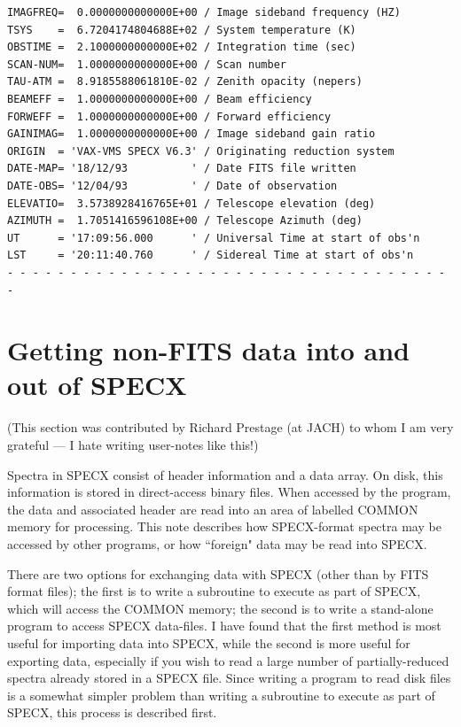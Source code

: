 \documentclass[11pt,twoside]{report}
\begin{document}
\begin{verbatim}
IMAGFREQ=  0.0000000000000E+00 / Image sideband frequency (HZ)
TSYS    =  6.7204174804688E+02 / System temperature (K)
OBSTIME =  2.1000000000000E+02 / Integration time (sec)
SCAN-NUM=  1.0000000000000E+00 / Scan number                                    
TAU-ATM =  8.9185588061810E-02 / Zenith opacity (nepers)
BEAMEFF =  1.0000000000000E+00 / Beam efficiency
FORWEFF =  1.0000000000000E+00 / Forward efficiency 
GAINIMAG=  1.0000000000000E+00 / Image sideband gain ratio
ORIGIN  = 'VAX-VMS SPECX V6.3' / Originating reduction system 
DATE-MAP= '18/12/93          ' / Date FITS file written
DATE-OBS= '12/04/93          ' / Date of observation
ELEVATIO=  3.5738928416765E+01 / Telescope elevation (deg)
AZIMUTH =  1.7051416596108E+00 / Telescope Azimuth (deg)
UT      = '17:09:56.000      ' / Universal Time at start of obs'n
LST     = '20:11:40.760      ' / Sidereal Time at start of obs'n
- - - - - - - - - - - - - - - - - - - - - - - - - - - - - - - - - - - - 
\end{verbatim}

\newpage
\chapter{Getting non-FITS data into and out of SPECX}

(This section was contributed by Richard Prestage (at JACH) to whom I am
very grateful --- I hate writing user-notes like this!)

Spectra in SPECX consist of header information and a data array. On
disk, this information is stored in direct-access binary files. When
accessed by the program, the data and associated header are read into
an area of labelled COMMON memory for processing. This note describes
how SPECX-format spectra may be accessed by other programs, or how
``foreign" data may be read into SPECX. 

There are two options for exchanging data with SPECX (other than by FITS
format files); the first is to
write a subroutine to execute as part of SPECX, which will access the
COMMON memory; the second is to write a stand-alone program to access
SPECX data-files. I have found that the first method is most useful
for importing data into SPECX, while the second is more useful for
exporting data, especially if you wish to read a large number of
partially-reduced spectra already stored in a SPECX file. Since
writing a program to read disk files is a somewhat simpler problem
than writing a subroutine to execute as part of SPECX, this process is
described first. 
                                                   
\end{document}

